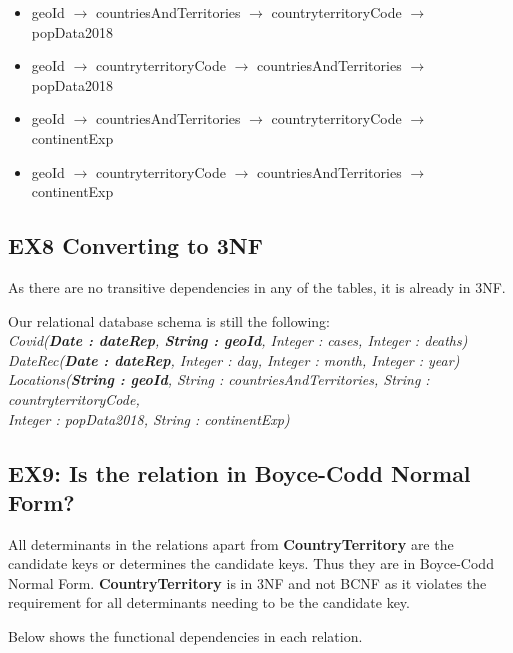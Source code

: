 \documentclass{report}
\begin{document}
\begin{itemize} 
\item geoId $\rightarrow$ countriesAndTerritories $\rightarrow$ countryterritoryCode $\rightarrow$ popData2018 
\item geoId $\rightarrow$ countryterritoryCode $\rightarrow$ countriesAndTerritories $\rightarrow$ popData2018
\item geoId $\rightarrow$ countriesAndTerritories $\rightarrow$ countryterritoryCode $\rightarrow$ continentExp 
\item geoId $\rightarrow$ countryterritoryCode $\rightarrow$ countriesAndTerritories $\rightarrow$ continentExp
\end{itemize}
\vspace{2mm}

\subsection*{EX8 Converting to 3NF}
As there are no transitive dependencies in any of the tables, it is already in 3NF.
\item Our relational database schema is still the following: \vspace{2mm}\\
\noindent
\textit{Covid(\textbf{Date : dateRep}, \textbf{String : geoId}, Integer : cases, Integer : deaths)} \\
\textit{DateRec(\textbf{Date : dateRep}, Integer : day, Integer : month, Integer : year)}\\
\textit{Locations(\textbf{String : geoId}, String : countriesAndTerritories, String : countryterritoryCode, \\ Integer : popData2018, String : continentExp)} \\
\vspace{2mm}

\subsection*{EX9: Is the relation in Boyce-Codd Normal Form? }
All determinants in the relations apart from \textbf{CountryTerritory} are the candidate keys or determines the candidate keys. Thus they are in Boyce-Codd Normal Form. \textbf{CountryTerritory} is in 3NF and not BCNF as it violates the requirement for all determinants needing to be the candidate key. 

Below shows the functional dependencies in each relation.
\end{document}
